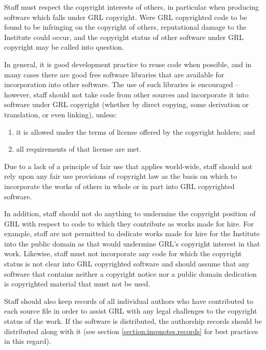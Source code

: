 \documentclass[10pt,a4paper]{article}
\begin{document}
\par Staff must respect the copyright interests of others, in particular when producing 
software which falls under GRL copyright. Were GRL copyrighted code to be found 
to be infringing on the copyright of others, reputational damage to the Institute could 
occur, and the copyright status of other software under GRL copyright may be called 
into question. 

\par In general, it is good development practice to reuse code when possible, and in 
many cases there are good free software libraries that are available for 
incorporation into other software. The use of such libraries is encouraged -- however, 
staff should not take code from other sources and incorporate it into software under 
GRL copyright (whether by direct copying, some derivation or translation, or even 
linking), unless:
\begin{enumerate}
\item it is allowed under the terms of license offered by the copyright holders; and
\item all requirements of that license are met. 
\end{enumerate} 

\par Due to a lack of a principle of fair use that applies world-wide, staff should not 
rely upon any fair use provisions of copyright law as the basis on which to 
incorporate the works of others in whole or in part into GRL copyrighted software. 

\par In addition, staff should not do anything to undermine the copyright position of GRL 
with respect to code to which they contribute as works made for hire. For example, 
staff are not permitted to dedicate works made for hire for the Institute into the 
public domain as that would undermine GRL's copyright interest in that work. 
Likewise, staff must not incorporate any code for which the copyright status is 
not clear into GRL copyrighted software and should assume that any software 
that contains neither a copyright notice nor a public domain dedication is copyrighted 
material that must not be used. 

\par Staff should also keep records of all individual authors who have contributed to 
each source file in order to assist GRL with any legal challenges to the copyright 
status of the work. If the software is distributed, the authorship records should be 
distributed along with it (see section \ref{section:impnotes.records} for best practices 
in this regard). 
\end{document}
